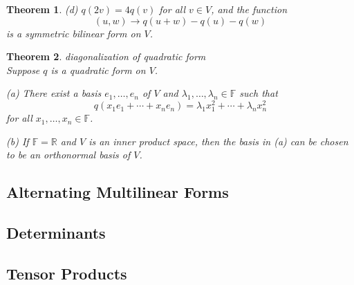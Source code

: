 \documentclass{article}
\newtheorem{theorem}{Theorem}[subsection]
\newcommand{\RR}{\mathbb{R}}
\newcommand{\FF}{\mathbb{F}}
\begin{document}
\begin{CJK}{UTF8}{gkai}
\begin{theorem}
    (d) $q(2v) = 4q(v)$ for all $v \in V$, and the function
    \[(u, w) \to q(u+w)-q(u)-q(w)\]
    is a symmetric bilinear form on $V$.
\end{theorem}   

\begin{theorem}
    diagonalization of quadratic form\\
    
    Suppose $q$ is a quadratic form on $V$.

    (a) There exist a basis $e_1,\ldots,e_n$ of $V$ and $\lambda_1,\ldots, \lambda_n \in \FF$ such that
    \[q(x_1e_1 + \cdots +x_ne_n) = \lambda_1x_1^2 +\cdots+ \lambda_n x_n^2\]
    for all $x_1,\ldots,x_n \in \FF$.

    (b) If $\FF = \RR$ and $V$ is an inner product space, then the basis in (a) can be chosen to be an orthonormal basis of $V$.
\end{theorem}

\subsection{Alternating Multilinear Forms}

\subsection{Determinants}

\subsection{Tensor Products}

\end{CJK}
\end{document}
